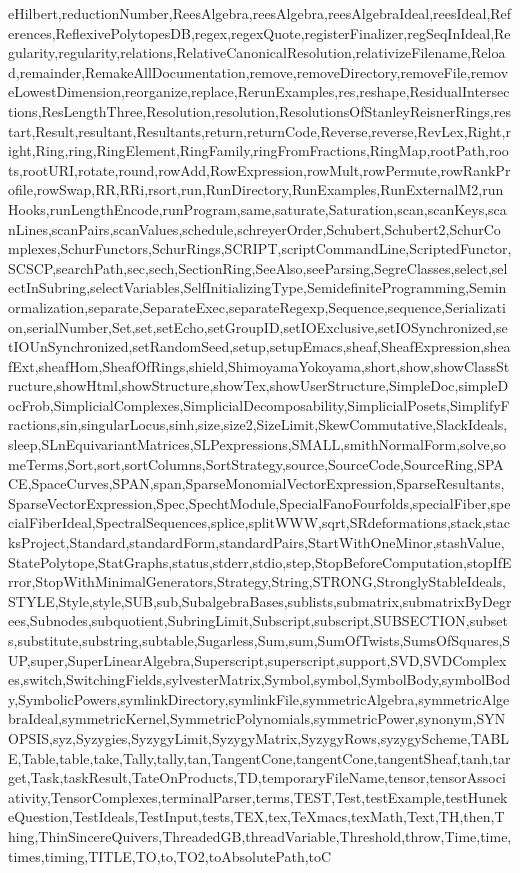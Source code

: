 {eHilbert,reductionNumber,ReesAlgebra,reesAlgebra,reesAlgebraIdeal,reesIdeal,References,ReflexivePolytopesDB,regex,regexQuote,registerFinalizer,regSeqInIdeal,Regularity,regularity,relations,RelativeCanonicalResolution,relativizeFilename,Reload,remainder,RemakeAllDocumentation,remove,removeDirectory,removeFile,removeLowestDimension,reorganize,replace,RerunExamples,res,reshape,ResidualIntersections,ResLengthThree,Resolution,resolution,ResolutionsOfStanleyReisnerRings,restart,Result,resultant,Resultants,return,returnCode,Reverse,reverse,RevLex,Right,right,Ring,ring,RingElement,RingFamily,ringFromFractions,RingMap,rootPath,roots,rootURI,rotate,round,rowAdd,RowExpression,rowMult,rowPermute,rowRankProfile,rowSwap,RR,RRi,rsort,run,RunDirectory,RunExamples,RunExternalM2,runHooks,runLengthEncode,runProgram,same,saturate,Saturation,scan,scanKeys,scanLines,scanPairs,scanValues,schedule,schreyerOrder,Schubert,Schubert2,SchurComplexes,SchurFunctors,SchurRings,SCRIPT,scriptCommandLine,ScriptedFunctor,SCSCP,searchPath,sec,sech,SectionRing,SeeAlso,seeParsing,SegreClasses,select,selectInSubring,selectVariables,SelfInitializingType,SemidefiniteProgramming,Seminormalization,separate,SeparateExec,separateRegexp,Sequence,sequence,Serialization,serialNumber,Set,set,setEcho,setGroupID,setIOExclusive,setIOSynchronized,setIOUnSynchronized,setRandomSeed,setup,setupEmacs,sheaf,SheafExpression,sheafExt,sheafHom,SheafOfRings,shield,ShimoyamaYokoyama,short,show,showClassStructure,showHtml,showStructure,showTex,showUserStructure,SimpleDoc,simpleDocFrob,SimplicialComplexes,SimplicialDecomposability,SimplicialPosets,SimplifyFractions,sin,singularLocus,sinh,size,size2,SizeLimit,SkewCommutative,SlackIdeals,sleep,SLnEquivariantMatrices,SLPexpressions,SMALL,smithNormalForm,solve,someTerms,Sort,sort,sortColumns,SortStrategy,source,SourceCode,SourceRing,SPACE,SpaceCurves,SPAN,span,SparseMonomialVectorExpression,SparseResultants,SparseVectorExpression,Spec,SpechtModule,SpecialFanoFourfolds,specialFiber,specialFiberIdeal,SpectralSequences,splice,splitWWW,sqrt,SRdeformations,stack,stacksProject,Standard,standardForm,standardPairs,StartWithOneMinor,stashValue,StatePolytope,StatGraphs,status,stderr,stdio,step,StopBeforeComputation,stopIfError,StopWithMinimalGenerators,Strategy,String,STRONG,StronglyStableIdeals,STYLE,Style,style,SUB,sub,SubalgebraBases,sublists,submatrix,submatrixByDegrees,Subnodes,subquotient,SubringLimit,Subscript,subscript,SUBSECTION,subsets,substitute,substring,subtable,Sugarless,Sum,sum,SumOfTwists,SumsOfSquares,SUP,super,SuperLinearAlgebra,Superscript,superscript,support,SVD,SVDComplexes,switch,SwitchingFields,sylvesterMatrix,Symbol,symbol,SymbolBody,symbolBody,SymbolicPowers,symlinkDirectory,symlinkFile,symmetricAlgebra,symmetricAlgebraIdeal,symmetricKernel,SymmetricPolynomials,symmetricPower,synonym,SYNOPSIS,syz,Syzygies,SyzygyLimit,SyzygyMatrix,SyzygyRows,syzygyScheme,TABLE,Table,table,take,Tally,tally,tan,TangentCone,tangentCone,tangentSheaf,tanh,target,Task,taskResult,TateOnProducts,TD,temporaryFileName,tensor,tensorAssociativity,TensorComplexes,terminalParser,terms,TEST,Test,testExample,testHunekeQuestion,TestIdeals,TestInput,tests,TEX,tex,TeXmacs,texMath,Text,TH,then,Thing,ThinSincereQuivers,ThreadedGB,threadVariable,Threshold,throw,Time,time,times,timing,TITLE,TO,to,TO2,toAbsolutePath,toC}
